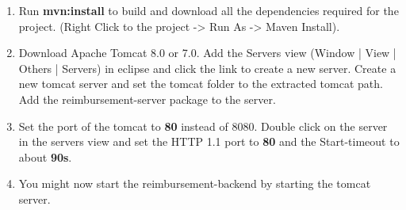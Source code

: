\begin{enumerate}
	\item Run \textbf{mvn:install} to build and download all the dependencies required for the project. (Right Click to the project -> Run As -> Maven Install).
	\item  Download Apache Tomcat 8.0 or 7.0. Add the Servers view (Window | View | Others | Servers) in eclipse and click the link to create a new server. Create a new tomcat server and set the tomcat folder to the extracted tomcat path. Add the reimbursement-server package to the server.
	\item Set the port of the tomcat to \textbf{80} instead of 8080. Double click on the server in the servers view and set the HTTP 1.1 port to \textbf{80} and the Start-timeout to about \textbf{90s}.	
	\item  You might now start the reimbursement-backend by starting the tomcat server.
\end{enumerate}

